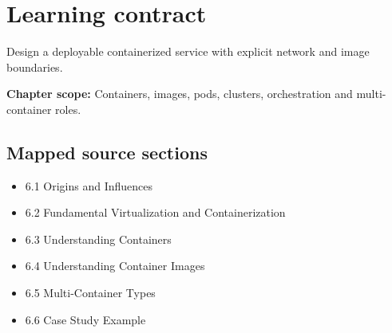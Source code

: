 \documentclass[10pt,letterpaper]{article}
\begin{document}
\sourceStatement
\tableofcontents
\newpage
\section{Learning contract}
\begin{takeaway}
Design a deployable containerized service with explicit network and image boundaries.
\end{takeaway}
\textbf{Chapter scope:} Containers, images, pods, clusters, orchestration and multi-container roles.\\
\subsection{Mapped source sections}
\begin{itemize}
\item 6.1 Origins and Influences
\item 6.2 Fundamental Virtualization and Containerization
\item 6.3 Understanding Containers
\item 6.4 Understanding Container Images
\item 6.5 Multi-Container Types
\item 6.6 Case Study Example
\end{itemize}
\end{document}
